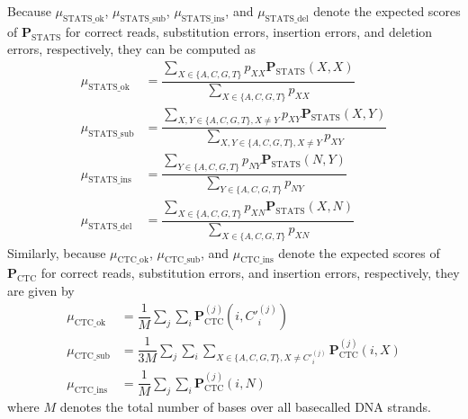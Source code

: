 \documentclass[sotsuron]{kuee}
\begin{document}
Because $\mu_{\mathrm{STATS}\_\mathrm{ok}}$, $\mu_{\mathrm{STATS}\_\mathrm{sub}}$,
$\mu_{\mathrm{STATS}\_\mathrm{ins}}$, and $\mu_{\mathrm{STATS}\_\mathrm{del}}$ denote the expected
scores of $\bm{P}_{\mathrm{STATS}}$ for correct reads, substitution errors, insertion errors, and
deletion errors, respectively, they can be computed as
\begin{align}
  \mu_{\mathrm{STATS}\_\mathrm{ok}} &= \dfrac{\displaystyle \sum_{X \in \{A,C,G,T\}} p_{XX} \bm{P}_{\mathrm{STATS}}(X,X)}{\displaystyle \sum_{X \in \{A,C,G,T\}} p_{XX}} \\
  \mu_{\mathrm{STATS}\_\mathrm{sub}} &= \dfrac{\displaystyle \sum_{X,Y \in \{A,C,G,T\}, X \neq Y} p_{XY} \bm{P}_{\mathrm{STATS}}(X,Y)}{\displaystyle \sum_{X,Y \in \{A,C,G,T\}, X \neq Y} p_{XY}} \\
  \mu_{\mathrm{STATS}\_\mathrm{ins}} &= \dfrac{\displaystyle \sum_{Y \in \{A,C,G,T\}} p_{NY} \bm{P}_{\mathrm{STATS}}(N,Y)}{\displaystyle \sum_{Y \in \{A,C,G,T\}} p_{NY}} \\
  \mu_{\mathrm{STATS}\_\mathrm{del}} &= \dfrac{\displaystyle \sum_{X \in \{A,C,G,T\}} p_{XN} \bm{P}_{\mathrm{STATS}}(X,N)}{\displaystyle \sum_{X \in \{A,C,G,T\}} p_{XN}}
\end{align}
Similarly, because $\mu_{\mathrm{CTC}\_\mathrm{ok}}$, $\mu_{\mathrm{CTC}\_\mathrm{sub}}$, and
$\mu_{\mathrm{CTC}\_\mathrm{ins}}$ denote the expected scores of $\bm{P}_{\mathrm{CTC}}$ for correct
reads, substitution errors, and insertion errors, respectively, they are given by
\begin{align}
  \mu_{\mathrm{CTC}\_\mathrm{ok}} &= \dfrac{1}{M}\sum_j \sum_i \bm{P}_{\mathrm{CTC}}^{(j)}(i, C'^{(j)}_i) \\
  \mu_{\mathrm{CTC}\_\mathrm{sub}} &= \dfrac{1}{3M}\sum_j \sum_i \sum_{X \in \{A,C,G,T\}, X \neq C'^{(j)}_i} \bm{P}_{\mathrm{CTC}}^{(j)}(i, X) \\
  \mu_{\mathrm{CTC}\_\mathrm{ins}} &= \dfrac{1}{M}\sum_j \sum_i \bm{P}_{\mathrm{CTC}}^{(j)}(i, N)
\end{align}
where $M$ denotes the total number of bases over all basecalled DNA strands.
\end{document}
